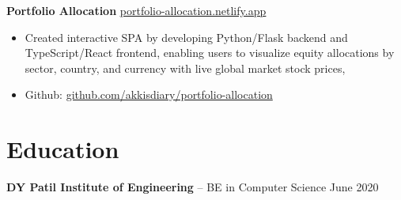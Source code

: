 \documentclass[11pt]{article}       %
\begin{document}
\textbf{Portfolio Allocation} \hfill \href{https://portfolio-allocation.netlify.app/}{\underline{portfolio-allocation.netlify.app}} \\

\begin{itemize}
  \item Created interactive SPA by developing Python/Flask backend and TypeScript/React frontend, enabling users to visualize equity allocations by sector, country, and currency with live global market stock prices, \\
  \item Github: \href{https://github.com/Akkisdiary/portfolio-allocation}{github.com/akkisdiary/portfolio-allocation} \\
\end{itemize}

\section*{Education}

\textbf{DY Patil Institute of Engineering} -- BE in Computer Science \hfill June 2020 \\
\end{document}
